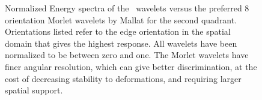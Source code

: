   \begin{figure}
    \newline
    \subfloat{%
      \makebox[\textwidth][c]{%
    }}
    \newline
    \caption[Comparison of the energy spectra for \DTCWT\ wavelets to Morlet
    wavelets]
    {Normalized Energy spectra of the \DTCWT\ wavelets versus the preferred
            8 orientation Morlet wavelets by Mallat for the second quadrant.
            Orientations listed refer to the edge orientation in the spatial
            domain that gives the highest response. All wavelets have been
            normalized to be between zero and one.
            The Morlet wavelets have finer angular
            resolution, which can give better discrimination, at the cost of
            decreasing stability to deformations, and requiring larger spatial
            support.}
    \label{fig:wavelet_freq_resp}
  \end{figure}
